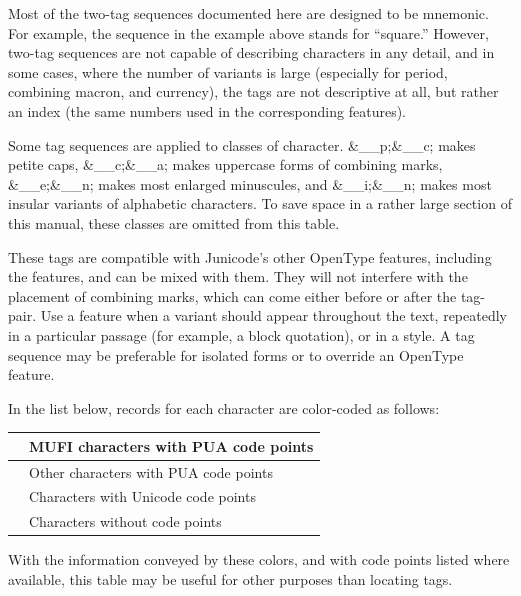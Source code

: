 Most of the two-tag sequences documented here are designed to be mnemonic. For example, the
 sequence in the example
above stands for ``square.'' However, two-tag sequences are not capable of describing characters in any detail, and in
some cases, where the number of variants is large (especially for period, combining macron, and currency), the tags are
not descriptive at all, but rather an index (the same numbers used in the corresponding  features).

Some tag sequences are applied to classes of character. \&\_\_p;\&\_\_c; makes petite caps, \&\_\_c;\&\_\_a;
makes uppercase forms of combining marks, \&\_\_e;\&\_\_n; makes most enlarged minuscules, and \&\_\_i;\&\_\_n; makes
most insular variants of alphabetic characters. To save space in a rather large section of this manual, these classes 
are omitted from this table.

These tags are compatible with Junicode's other OpenType features, including the  features, 
and can be mixed with
them. They will not interfere with the placement of combining marks, which can come either before or after the tag-pair. 
Use a  feature when a variant should appear
throughout the text, repeatedly in a particular passage (for example, a block quotation), or in a style. A tag sequence may be preferable for isolated forms or to override an OpenType feature.

In the list below, records for each character are color-coded as follows:

\begin{center}
  \tablefirsthead{}
  \tablehead{}
  \tabletail{\hline}
  \tablelasttail{\hline}
  \begin{supertabular}{|m{13mm}|m{72mm}|}
    \hline
     & MUFI characters with PUA code points\\\hline
     & Other characters with PUA code points\\\hline
     & Characters with Unicode code points\\\hline
     & Characters without code points\\
  \end{supertabular}
\end{center}

\noindent With the information conveyed by these colors, and with code points listed
where available, this table may be useful for other purposes than locating tags.

